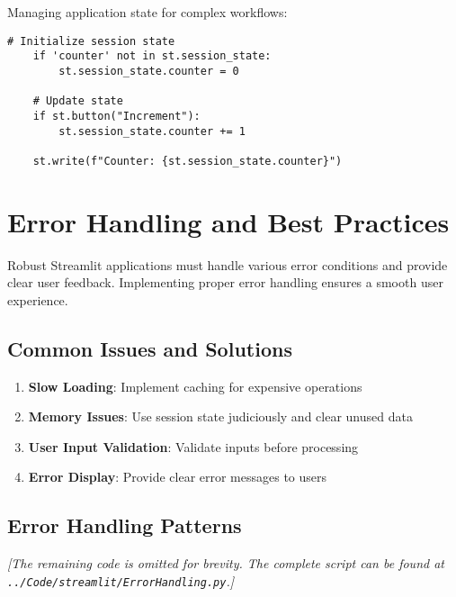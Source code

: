 Managing application state for complex workflows:

\begin{lstlisting}[language=MyPython, caption={Session State Usage}, label={lst:session_state}]
	# Initialize session state
	if 'counter' not in st.session_state:
	    st.session_state.counter = 0
	
	# Update state
	if st.button("Increment"):
	    st.session_state.counter += 1
	
	st.write(f"Counter: {st.session_state.counter}")
\end{lstlisting}

\section{Error Handling and Best Practices}
\label{sec:best_practices}

Robust Streamlit applications must handle various error conditions and provide clear user feedback. Implementing proper error handling ensures a smooth user experience.

\subsection{Common Issues and Solutions}
\label{subsec:common_issues}

\begin{enumerate}
	\item \textbf{Slow Loading}: Implement caching for expensive operations
	\item \textbf{Memory Issues}: Use session state judiciously and clear unused data
	\item \textbf{User Input Validation}: Validate inputs before processing
	\item \textbf{Error Display}: Provide clear error messages to users
\end{enumerate}

\subsection{Error Handling Patterns}
\label{subsec:error_patterns}



\noindent\textit{[The remaining code is omitted for brevity. The complete script can be found at \texttt{../Code/streamlit/ErrorHandling.py}.]}

